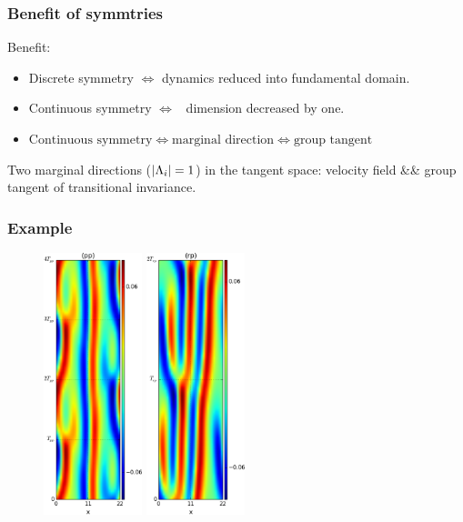 \documentclass[mathserif, handout]{beamer}
\begin{document}
\begin{frame}
  \frametitle{Benefit of symmtries}
  {\color{green} Benefit}:
  \begin{itemize}
  \item  Discrete symmetry $\Leftrightarrow$ dynamics reduced into
    fundamental domain.
  \item   Continuous symmetry $\Leftrightarrow$ \statesp\ dimension decreased by one.

  \item
    $
    \text{Continuous symmetry} \Leftrightarrow
    \text{marginal direction} \Leftrightarrow
    \text{group tangent}
    $
  \end{itemize}

  \pause

  \begin{exampleblock}{Two marginal directions ($|\Lambda_{i}|=1$) in the
      tangent space:}
  velocity field \quad \&\& \quad group tangent of transitional invariance.
  \end{exampleblock}

\end{frame}

\begin{frame}
  \frametitle{Example}
  \begin{figure}[h]
    \centering
    \includegraphics[width=0.255\textwidth]{KSppo1State}
    \includegraphics[width=0.255\textwidth]{KSrpo1State}
  \end{figure}
\end{frame}
\end{document}
